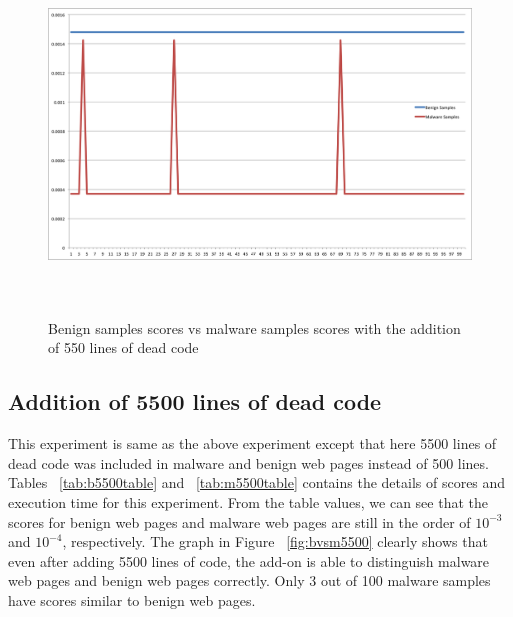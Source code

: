 \begin{figure}[h]
    \centering
    \includegraphics[width=16cm, height=9.53cm]{500.png}
    \caption[Benign Samples vs Malware Samples]{Benign samples scores vs malware samples scores with the addition of 550 lines of dead code}
    \label{fig:bvsm500}
\end{figure}


\subsection{Addition of 5500 lines of dead code}
This experiment is same as the above experiment except that here 5500 lines of dead code was included in malware and benign web pages instead of 500 lines. Tables ~\ref{tab:b5500table} and  ~\ref{tab:m5500table} contains the details of scores and execution time for this experiment. From the table values, we can see that the scores for benign web pages and malware web pages are still in the order of $10^{-3}$ and $10^{-4}$, respectively. The graph in Figure ~\ref{fig:bvsm5500} clearly shows that even after adding 5500 lines of code, the add-on is able to distinguish malware web pages and benign web pages correctly. Only 3 out of 100 malware samples have scores similar to benign web pages.

